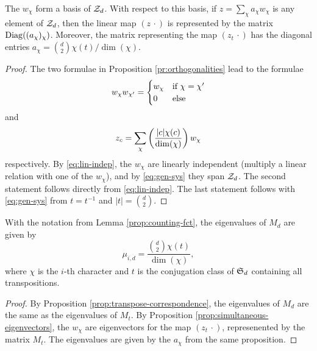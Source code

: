 \begin{prop} \label{prop:simultaneous-eigenvectors}
 The $w_\chi$ form a basis of $\mathcal{Z}_d$. With respect to this basis, if $z=\sum_\chi a_\chi w_\chi$ is any element of $\mathcal{Z}_d$, then the linear map $(z\,\cdot)$ is represented by the matrix $\operatorname{Diag}((a_\chi)_\chi)$. Moreover, the matrix representing the map $(z_t\,\cdot)$ has the diagonal entries $a_\chi=\binom{d}{2} \chi({t})/\dim({\chi})$. 
\end{prop}
\begin{proof}
 The two formulae in Proposition \ref{pr:orthogonalities} lead to the formulae
 \begin{equation} \label{eq:lin-indep}
  w_\chi w_{\chi'} =
  \begin{cases} w_\chi &\mbox{if } \chi = \chi' \\
                     0 &\mbox{else}
  \end{cases}
 \end{equation}
 and
 \begin{equation} \label{eq:gen-sys}
  z_c=\sum_{\chi}\left(\frac{|c|\chi(c)}{\dim(\chi)}\right)w_\chi
 \end{equation}
 respectively.
 By \eqref{eq:lin-indep}, the $w_\chi$ are linearly independent (multiply a linear relation with one of the $w_\chi$), and by \eqref{eq:gen-sys} they span $\mathcal{Z}_d$.
 The second statement follows directly from \eqref{eq:lin-indep}. The last statement follows with \eqref{eq:gen-sys} from $t=t^{-1}$ and $|t|=\binom{d}{2}$.
\end{proof}

\begin{lemma} \label{prop:eigenvalues}
 With the notation from Lemma \ref{prop:counting-fct}, the eigenvalues of $M_d$ are given by \[\mu_{i,d}=\frac{\binom{d}{2} \chi(t)}{\dim(\chi)},\] where $\chi$ is the $i$-th character and $t$ is the conjugation class of $\operatorname{\mathfrak{S}}_d$ containing all transpositions.
\end{lemma}
\begin{proof}
 By Proposition \ref{prop:transpose-correspondence}, the eigenvalues of $M_d$ are the same as the eigenvalues of $M_t$. By Proposition \ref{prop:simultaneous-eigenvectors}, the $w_\chi$ are eigenvectors for the map $(z_t\,\cdot)$, represenented by the matrix $M_t$. The eigenvalues are given by the $a_\chi$ from the same proposition.
\end{proof}
